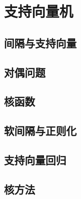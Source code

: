 \newpage
\section{支持向量机}

\subsection{间隔与支持向量}
\subsection{对偶问题}
\subsection{核函数}
\subsection{软间隔与正则化}
\subsection{支持向量回归}
\subsection{核方法}
